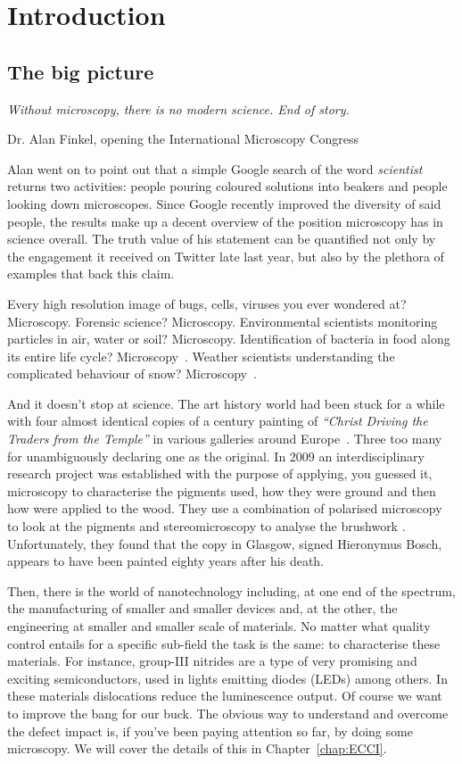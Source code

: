 \chapter{Introduction}

\section{The big picture}


\epigraph{\textit{Without microscopy, there is no modern science. End of story.}}{Dr. Alan Finkel, opening the  International Microscopy Congress \cite{alanSpeech}}
Alan went on to point out that a simple Google search of the word \textit{scientist} returns two activities: people pouring coloured solutions into beakers and people looking down microscopes. Since Google recently improved the diversity of said people, the results make up a decent overview of the position microscopy has in science overall.
The truth value of his statement can be quantified not only by the engagement it received on Twitter late last year, but also by the plethora of examples that back this claim. 
  
Every high resolution image of bugs, cells, viruses you ever wondered at? Microscopy.  Forensic science? Microscopy. Environmental scientists monitoring particles in air, water or soil? Microscopy. Identification of bacteria in food along its entire life cycle? Microscopy~\cite{microscopy}. Weather scientists understanding the complicated behaviour of snow? Microscopy~\cite{Leppard96}. 
 
And it doesn't stop at science. The art history world had been stuck for a while with four almost identical copies of a  century painting of \textit{``Christ Driving the Traders from the Temple''} in various galleries around Europe~\cite{GoogleArts}. Three too many for unambiguously declaring one as the original. In 2009 an interdisciplinary research project was established with the purpose of applying, you guessed it, microscopy to characterise the pigments used, how they were ground and then how were applied to the wood. They use a combination of polarised microscopy to look at the pigments and stereomicroscopy to analyse the brushwork \cite{Hermens2012}. Unfortunately, they found that the copy in Glasgow, signed Hieronymus Bosch, appears to have been painted eighty years after his death.  

Then, there is the world of nanotechnology including, at one end of the spectrum, the manufacturing of smaller and smaller devices and, at the other, the engineering at smaller and smaller scale of materials. No matter what quality control entails for a specific sub-field the task is the same: to characterise these materials. For instance, group-III nitrides are a type of very promising and exciting semiconductors, used in lights emitting diodes (LEDs) among others. In these materials dislocations reduce the luminescence output. Of course we want to improve the bang for our buck. The obvious way to understand and overcome the defect impact is, if you've been paying attention so far, by doing some microscopy. We will cover the details of this in Chapter~\ref{chap:ECCI}.

